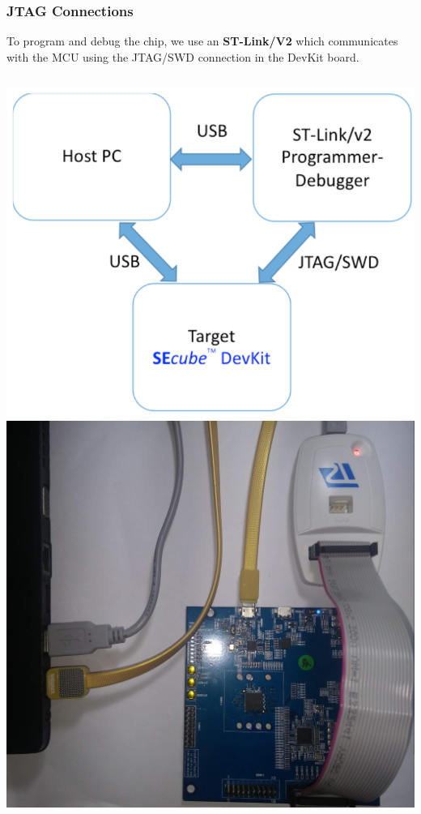 \documentclass[14pt,usenames,dvipsnames]{beamer}
\begin{document}
\begin{frame}
	\frametitle{JTAG Connections}
	
To program and debug the chip, we use an \textbf{{\color{NavyBlue}ST-Link/V2}} which communicates with the MCU using the JTAG/SWD connection in the DevKit board.

  \begin{columns}
      \includegraphics[width=\textwidth]{conSche}
      \includegraphics[width=\textwidth]{conReal2}
  \end{columns}
\end{frame}
\end{document}
